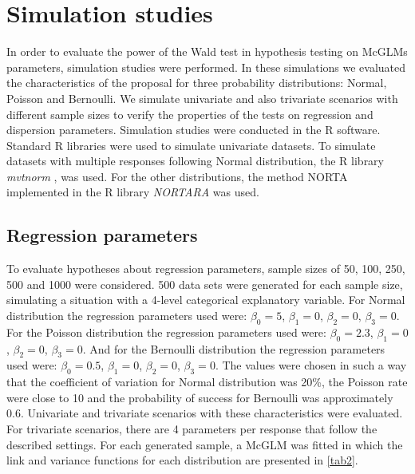 \documentclass[AMA,STIX1COL]{WileyNJD-v2}
\begin{document}

\section{Simulation studies}\label{sec5}

In order to evaluate the power of the Wald test in hypothesis testing on McGLMs parameters, simulation studies were performed. In these simulations we evaluated the characteristics of the proposal for three probability distributions: Normal, Poisson and Bernoulli. We simulate univariate and also trivariate scenarios with different sample sizes to verify the properties of the tests on regression and dispersion parameters. Simulation studies were conducted in the R \cite{R} software. Standard R libraries were used to simulate univariate datasets. To simulate datasets with multiple responses following Normal distribution, the R library \emph{mvtnorm} \cite{mvtnorm1}, \cite{mvtnorm2} was used. For the other distributions, the method NORTA \cite{norta} implemented in the R library \emph{NORTARA} \cite{nortara} was used.

\subsection{Regression parameters}

To evaluate hypotheses about regression parameters, sample sizes of 50, 100, 250, 500 and 1000 were considered. 500 data sets were generated for each sample size, simulating a situation with a 4-level categorical explanatory variable. For Normal distribution the regression parameters used were: $\beta_0 = 5$, $\beta_1 = 0$, $\beta_2 = 0$, $\beta_3 = 0$. For the Poisson distribution the regression parameters used were: $\beta_0 = 2.3$, $\beta_1 = 0$, $\beta_2 = 0$, $\beta_3 = 0$. And for the Bernoulli distribution the regression parameters used were: $\beta_0 = 0.5$, $\beta_1 = 0$, $\beta_2 = 0$, $\beta_3 = 0$. The values were chosen in such a way that the coefficient of variation for Normal distribution was 20\%, the Poisson rate were close to 10 and the probability of success for Bernoulli was approximately 0.6. Univariate and trivariate scenarios with these characteristics were evaluated. For trivariate scenarios, there are 4 parameters per response that follow the described settings. For each generated sample, a McGLM was fitted in which the link and variance functions for each distribution are presented in \autoref{tab2}.
\end{document}
